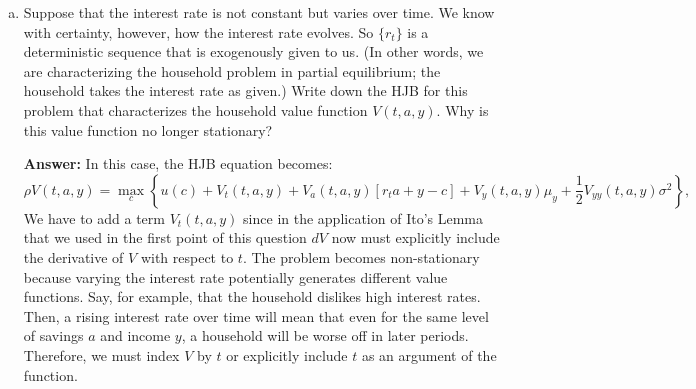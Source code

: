 \documentclass[11pt]{extarticle}
\theoremstyle{plain}
\theoremstyle{definition}
\begin{document}
\begin{enumerate}[(a)]
\item Suppose that the interest rate is not constant but varies over time. We know with certainty, however, how the interest rate evolves. So $\{r_t\}$ is a deterministic sequence that is exogenously given to us. (In other words, we are characterizing the household problem in partial equilibrium; the household takes the interest rate as given.) Write down the HJB for this problem that characterizes the household value function $V(t, a, y)$. Why is this value function no longer stationary?

\textbf{Answer:} In this case, the HJB equation becomes:
\[
\rho V(t, a, y) = \max_{c} \left\{ u(c) + V_t(t, a, y) + V_a(t, a, y) \left[ r_t a + y - c \right] + V_y(t, a, y) \mu_y + \frac{1}{2} V_{yy}(t, a, y) \sigma^2 \right\},
\]
We have to add a term $V_t(t, a, y)$ since in the application of Ito's Lemma that we used in the first point of this question $dV$ now must explicitly include the derivative of $V$ with respect to $t$. The problem becomes non-stationary because varying the interest rate potentially generates different value functions. Say, for example, that the household dislikes high interest rates. Then, a rising interest rate over time will mean that even for the same level of savings $a$ and income $y$, a household will be worse off in later periods. Therefore, we must index $V$ by $t$ or explicitly include $t$ as an argument of the function.

\end{enumerate}


% 
% 
% 
% 
\end{document}

